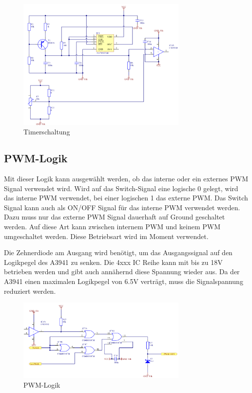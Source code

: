 \begin{figure}[h!]
	\centering
	\includegraphics[width=0.75\textwidth]{src/dc/fig/timer_schematic.png}
	\caption{Timerschaltung}
\end{figure}

\newpage
\subsection{PWM-Logik}
Mit dieser Logik kann ausgewählt werden, ob das interne oder ein externes
PWM Signal verwendet wird. Wird auf das Switch-Signal eine logische
0 gelegt, wird das interne PWM verwendet, bei einer logischen 1 das externe
PWM. Das Switch Signal kann auch als ON/OFF Signal für das interne PWM
verwendet werden. Dazu muss nur das externe PWM Signal dauerhaft auf Ground
geschaltet werden. Auf diese Art kann zwischen internem PWM und keinem PWM
umgeschaltet werden. Diese Betriebsart wird im Moment verwendet.

\noindent
Die Zehnerdiode am Ausgang wird benötigt, um das Ausgangssignal auf den
Logikpegel des A3941 zu senken. Die 4xxx IC Reihe kann mit bis zu 18\si{\volt} 
betrieben werden und gibt auch annähernd diese Spannung wieder aus. Da der 
A3941 einen maximalen Logikpegel von 6.5\si{\volt} verträgt, muss die 
Signalspannung reduziert werden.

\begin{figure}[h!]
	\centering
	\includegraphics[width=0.75\textwidth]{src/dc/fig/pwm_schematic.png}
	\caption{PWM-Logik}
\end{figure}

